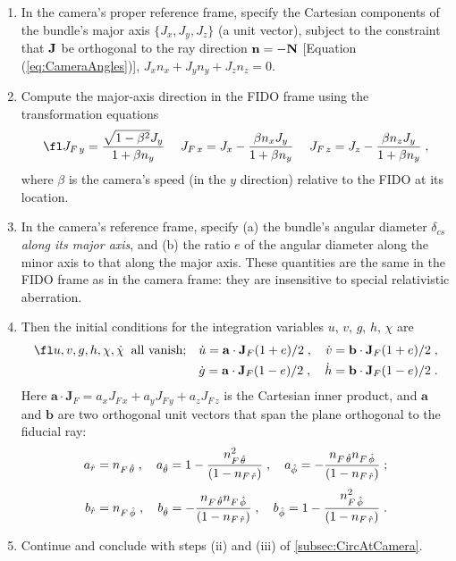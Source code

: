\documentclass[12pt]{iopart}
\newcommand{\mb}[1]{{\mathbf#1}} %
\begin{document}
\begin{enumerate}
\item
In the camera's proper reference frame, specify 
the Cartesian components of the bundle's major axis
$\{J_x,J_y,J_z\}$ (a unit vector), subject to the constraint that
$\bf J$  be orthogonal to the ray direction ${\bf n} = - {\bf N}$  [Equation (\ref{eq:CameraAngles})], 
$J_x n_x +  J_y n_y + J_z n_z = 0$.
\item
Compute the major-axis direction in the FIDO frame using the
transformation equations 
\begin{equation}
\fl
J_{F\,y}  = {\sqrt{1-\beta^2} J_y  \over 1+\beta n_y}\; \quad
J_{F\,x} = J_x - {\beta n_x J_y \over 1+\beta n_y}\; \quad
J_{F\,z} =J_z -{\beta n_z  J_y\over 1+\beta n_y}\;,
\label{eq:MajorAxisTransform}
\end{equation}
where $\beta$ is the camera's speed (in the $y$ direction) relative to the FIDO
at its location.
\item
In the camera's reference frame, specify (a) 
the bundle's angular diameter $\delta_{cs}$ \emph{along its major axis}, and (b) 
the ratio $e$ of the angular diameter along the
minor axis to that along the major axis.  These quantities are the same in the FIDO frame
as in the camera frame: they are insensitive to special relativistic aberration.
\item
Then the initial conditions for the integration variables $u$, $v$, $g$, $h$,
$\chi$ are
\begin{eqnarray}
\fl
 u,v,g,h,\chi,\dot\chi \; \;\textrm{all vanish;} \quad
 \dot u = \mb a \cdot \mb J_F {(1+e)}/2\;,  \quad
\dot v = \mb b \cdot \mb J_F {(1+e)}/2\;, \nonumber \\
\dot g = \mb a \cdot \mb J_F {(1-e)}/2\;, \quad
\dot h = \mb b \cdot \mb J_F {(1-e)}/2\;. 
\label{eq:InitialConditions}
\end{eqnarray}
Here  $\mb a \cdot \mb J_F = a_x J_{F\,x} + a_y J_{F\,y}
+ a_z J_{F\,z}$ is the Cartesian inner product, and $\mb a$ and $\mb b$ are  
two orthogonal unit vectors that span the plane orthogonal to the fiducial ray:
\begin{eqnarray}
a_{\hat r} = n_{F\,\hat\theta}  \;, \quad
a_{\hat \theta}=1 -{n_{F\,\hat\theta} ^2\over(1-n_{F\,\hat r} )}\;,\quad
a_{\hat \phi} = - {n_{F\,\hat\theta} n_{F\,\hat\phi}  \over (1-n_{F\,\hat r})}\;; \nonumber
\end{eqnarray}
\begin{eqnarray}
b_{\hat r}=n_{F\,\hat\phi} \;, \quad
b_{\hat \theta}= -{n_{F\,\hat\theta} n_{F\,\hat\phi} \over (1-n_{F\,\hat r} )}\;, \quad
b_{\hat \phi}= 1 - {n_{F\,\hat\phi}^2\over(1-n_{F\,\hat r})}\;.
\label{eq:bdef}
\end{eqnarray}
\item
Continue and conclude with steps (ii) and (iii) of \ref{subsec:CircAtCamera}.


\end{enumerate}
\end{document}
